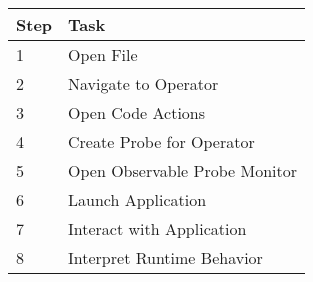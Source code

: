 \begin{table}[]
\begin{tabular}{|l|l|}
\hline
Step & Task                          \\ \hline
1    & Open File                     \\ \hline
2    & Navigate to Operator          \\ \hline
3    & Open Code Actions             \\ \hline
4    & Create Probe for Operator     \\ \hline
5    & Open Observable Probe Monitor \\ \hline
6    & Launch Application            \\ \hline
7    & Interact with Application     \\ \hline
8    & Interpret Runtime Behavior    \\ \hline
\end{tabular}
\end{table}